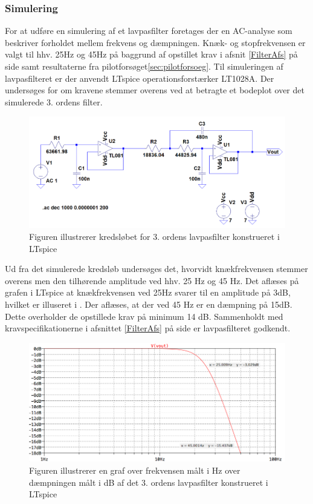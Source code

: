 \subsubsection{Simulering}
For at udføre en simulering af et lavpasfilter foretages der en AC-analyse som beskriver forholdet mellem frekvens og dæmpningen. Knæk- og stopfrekvensen er valgt til hhv. 25Hz og 45Hz på baggrund af opstillet krav i afsnit \ref{FilterAfs} på side \pageref{FilterAfs} samt resultaterne fra pilotforsøget\ref{sec:pilotforsoeg}. Til simuleringen af lavpasfilteret er der anvendt LTspice operationsforstærker LT1028A. Der undersøges for om kravene stemmer overens ved at betragte et bodeplot over det simulerede 3. ordens filter.

\begin{figure}[H]
	\centering
	\includegraphics[scale=0.4]{figures/cProblemloesning/Lavpasfilter_LTspice.PNG}
	\caption{Figuren illustrerer kredsløbet for 3. ordens lavpasfilter konstrueret i LTspice}
	\label{fig:lavpasfilter_LTspice}
\end{figure}

Ud fra det simulerede kredsløb undersøges det, hvorvidt knækfrekvensen stemmer overens men den tilhørende amplitude ved hhv. 25 Hz og 45 Hz. Det aflæses på grafen i LTspice at knækfrekvensen ved 25Hz svarer til en amplitude på 3dB, hvilket er illuseret i . Der aflæses, at der ved 45 Hz er en dæmpning på 15dB. Dette overholder de opstillede krav på minimum 14 dB. Sammenholdt med kravspecifikationerne i afsnittet \ref{FilterAfs} på side \pageref{FilterAfs} er lavpasfilteret godkendt.

\begin{figure}[H]
	\centering
	\includegraphics[scale=0.4]{figures/cProblemloesning/Lavpasfiltergraf_LTspice1.PNG}
	\caption{Figuren illustrerer en graf over frekvensen målt i Hz over dæmpningen målt i dB af det 3. ordens lavpasfilter konstrueret i LTspice}
	\label{fig:lavpasfilter_LTspice}
\end{figure}

